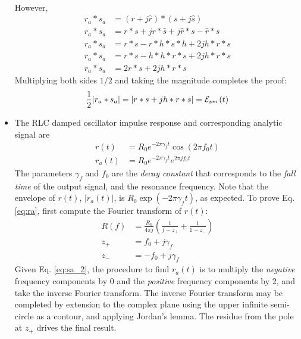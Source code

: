 \documentclass[amsmath,amssymb,aps,prd,10pt,twocolumn,showkeys]{revtex4}
\begin{document}
\begin{itemize}
\begin{align}
\end{align}
However,
\begin{align}
r_a * s_a &= (r + j \hat{r}) * (s + j \hat{s}) \\
r_a * s_a &= r * s + j r * \hat{s} + j \hat{r} * s - \hat{r} * \hat{s} \\
r_a * s_a &= r * s - r * h * s * h + 2 j h * r * s \\
r_a * s_a &= r * s - h * h * r * s + 2 j h * r * s \\
r_a * s_a &= 2 r * s + 2 j h * r * s
\end{align}
Multiplying both sides $1/2$ and taking the magnitude completes the proof:
\begin{equation}
\frac{1}{2} |r_a * s_a| = |r * s + j h * r * s| = \mathcal{E}_{s * r}(t) \\
\end{equation}
\item The RLC damped oscillator impulse response and corresponding analytic signal are
\begin{align}
r(t) &= R_0 e^{-2 \pi \gamma_f t} \cos(2\pi f_0 t) \label{eq:r} \\
r_a(t) &= R_0 e^{-2 \pi \gamma_f t} e^{2\pi j f_0 t} \label{eq:ra}
\end{align}
The parameters $\gamma_f$ and $f_0$ are the \textit{decay constant} that corresponds to the \textit{fall time} of the output signal, and the resonance frequency.  Note that the envelope of $r(t)$, $|r_a(t)|$, is $R_0 \exp(-2 \pi \gamma_f t)$, as expected.  To prove Eq. \ref{eq:ra}, first compute the Fourier transform of $r(t)$:
\begin{align}
R(f) &= \frac{R_0}{4\pi j} \left( \frac{1}{f - z_{+}} + \frac{1}{1- z_{-}} \right) \\
z_{+} &= f_0 + j \gamma_f \\
z_{-} &= -f_0 + j \gamma_f
\end{align}
Given Eq. \ref{eq:sa_2}, the procedure to find $r_a(t)$ is to multiply the \textit{negative} frequency components by 0 and the \textit{positive} frequency components by 2, and take the inverse Fourier transform.  The inverse Fourier transform may be completed by extension to the complex plane using the upper infinite semi-circle as a contour, and applying Jordan's lemma.  The residue from the pole at $z_{+}$ drives the final result.

\end{itemize}
\end{document}
